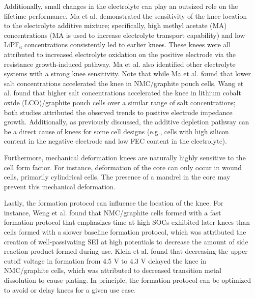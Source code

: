 \documentclass[journal=jpclcd,manuscript=article]{achemso}
\begin{document}
Additionally, small changes in the electrolyte can play an outsized role on the lifetime performance. Ma et al.\cite{ma_editors_2019} demonstrated the sensitivity of the knee location to the electrolyte additive mixture; specifically, high methyl acetate (MA) concentrations (MA is used to increase electrolyte transport capability) and low LiPF$_6$ concentrations consistently led to earlier knees. These knees were all attributed to increased electrolyte oxidation on the positive electrode via the resistance growth-induced pathway. Ma et al.\cite{ma_editors_2019} also identified other electrolyte systems with a strong knee sensitivity.
Note that while Ma et al.\cite{ma_editors_2019} found that lower salt concentrations accelerated the knee in NMC/graphite pouch cells,
Wang et al.\cite{wang_systematic_2014} found that higher salt concentrations accelerated the knee in lithium cobalt oxide (LCO)/graphite pouch cells over a similar range of salt concentrations; both studies attributed the observed trends to positive electrode impedance growth.
Additionally, as previously discussed, the additive depletion pathway can be a direct cause of knees for some cell designs (e.g., cells with high silicon content in the negative electrode and low FEC content in the electrolyte).\cite{petibon_studies_2016, jung_consumption_2016}

Furthermore, mechanical deformation knees are naturally highly sensitive to the cell form factor. For instance, deformation of the core \cite{pfrang_long-term_2018,carter_mechanical_2019,willenberg_development_2020} can only occur in wound cells, primarily cylindrical cells. The presence of a mandrel in the core may prevent this mechanical deformation.\cite{carter_mechanical_2019}

Lastly, the formation protocol can influence the location of the knee. For instance, Weng et al.\cite{weng_predicting_2021} found that NMC/graphite cells formed with a fast formation protocol that emphasizes time at high SOCs exhibited later knees than cells formed with a slower baseline formation protocol, which was attributed the creation of well-passivating SEI at high potentials to decrease the amount of side reaction product formed during use.\cite{attia_benefits_2021}
Klein et al.\cite{klein_demonstrating_2021} found that decreasing the upper cutoff voltage in formation from 4.5 V to 4.3 V delayed the knee in NMC/graphite cells, which was attributed to decreased transition metal dissolution to cause plating. In principle, the formation protocol can be optimized to avoid or delay knees for a given use case. 
\end{document}

